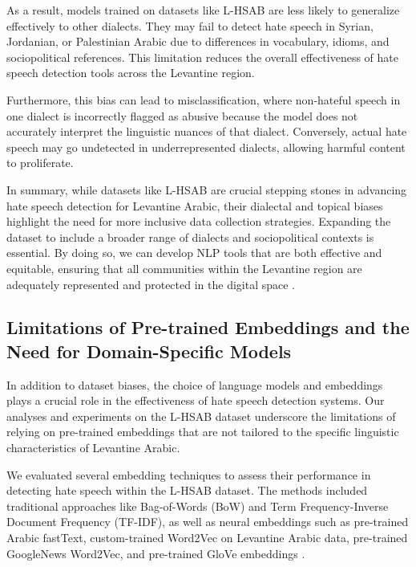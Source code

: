 \documentclass[11pt]{article}
\begin{document}
As a result, models trained on datasets like L-HSAB are less likely to generalize effectively to other dialects. They may fail to detect hate speech in Syrian, Jordanian, or Palestinian Arabic due to differences in vocabulary, idioms, and sociopolitical references. This limitation reduces the overall effectiveness of hate speech detection tools across the Levantine region.

Furthermore, this bias can lead to misclassification, where non-hateful speech in one dialect is incorrectly flagged as abusive because the model does not accurately interpret the linguistic nuances of that dialect. Conversely, actual hate speech may go undetected in underrepresented dialects, allowing harmful content to proliferate.

In summary, while datasets like L-HSAB are crucial stepping stones in advancing hate speech detection for Levantine Arabic, their dialectal and topical biases highlight the need for more inclusive data collection strategies. Expanding the dataset to include a broader range of dialects and sociopolitical contexts is essential. By doing so, we can develop NLP tools that are both effective and equitable, ensuring that all communities within the Levantine region are adequately represented and protected in the digital space \citep{barocas-hardt-narayanan}.


\subsection{Limitations of Pre-trained Embeddings and the Need for Domain-Specific Models}

In addition to dataset biases, the choice of language models and embeddings plays a crucial role in the effectiveness of hate speech detection systems. Our analyses and experiments on the L-HSAB dataset underscore the limitations of relying on pre-trained embeddings that are not tailored to the specific linguistic characteristics of Levantine Arabic.

We evaluated several embedding techniques to assess their performance in detecting hate speech within the L-HSAB dataset. The methods included traditional approaches like Bag-of-Words (BoW) and Term Frequency-Inverse Document Frequency (TF-IDF), as well as neural embeddings such as pre-trained Arabic fastText, custom-trained Word2Vec on Levantine Arabic data, pre-trained GoogleNews Word2Vec, and pre-trained GloVe embeddings \citep{Harris1954DistributionalS, 10.5555/106765.106782, bojanowski2016enriching, mikolov2013efficientestimationwordrepresentations, pennington-etal-2014-glove}.
\end{document}
